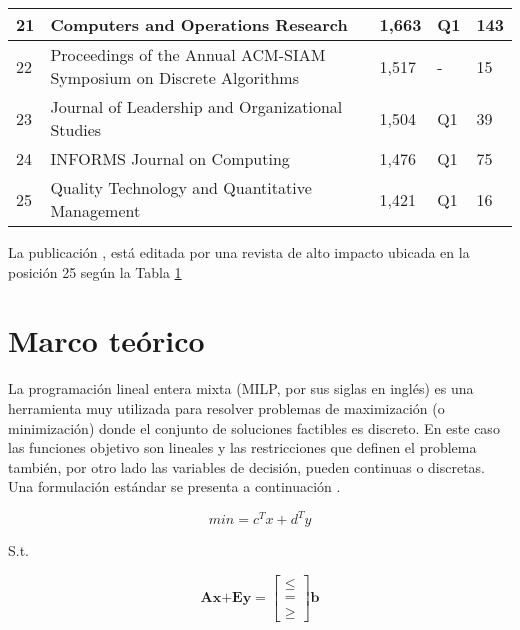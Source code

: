 \documentclass{article}
\begin{document}
\begin{table}[H]
\begin{tabular}{@{}lllll@{}}
\multicolumn{1}{|l|}{21} & \multicolumn{1}{l|}{Computers and Operations Research} & \multicolumn{1}{l|}{1,663} & \multicolumn{1}{l|}{Q1} & \multicolumn{1}{l|}{143} \\ \midrule
\multicolumn{1}{|l|}{22} & \multicolumn{1}{l|}{Proceedings of the Annual ACM-SIAM Symposium on Discrete Algorithms} & \multicolumn{1}{l|}{1,517} & \multicolumn{1}{l|}{-} & \multicolumn{1}{l|}{15} \\ \midrule
\multicolumn{1}{|l|}{23} & \multicolumn{1}{l|}{Journal of Leadership and Organizational Studies} & \multicolumn{1}{l|}{1,504} & \multicolumn{1}{l|}{Q1} & \multicolumn{1}{l|}{39} \\ \midrule
\multicolumn{1}{|l|}{24} & \multicolumn{1}{l|}{INFORMS Journal on Computing} & \multicolumn{1}{l|}{1,476} & \multicolumn{1}{l|}{Q1} & \multicolumn{1}{l|}{75} \\ \midrule
\multicolumn{1}{|l|}{25} & \multicolumn{1}{l|}{Quality Technology and Quantitative Management} & \multicolumn{1}{l|}{1,421} & \multicolumn{1}{l|}{Q1} & \multicolumn{1}{l|}{16} \\ \midrule
\hline %
\end{tabular}
\label{table:indice}
\end{table}

La publicación \cite{article1}, está editada por una revista de alto impacto ubicada en la posición 25 según la Tabla \ref{table:indice}

\section{Marco teórico}

La programación lineal entera mixta (MILP, por sus siglas en inglés) es una herramienta muy utilizada para resolver problemas de maximización (o minimización) donde el conjunto de soluciones factibles es discreto. 
En este caso las funciones objetivo son lineales y las restricciones que definen el problema también, por otro lado las variables de decisión, pueden continuas o discretas. Una formulación estándar se presenta a continuación \cite{article3} .

\begin{equation}
min=c^{T}x+d^{T}y 
\label{min}
\end{equation}

S.t.

\begin{equation*}
\textbf{Ax+Ey}=
\begin{bmatrix}
\leq \\
= \\
\geq 
\end{bmatrix}
\textbf{b}
\end{equation*}
\end{document}
